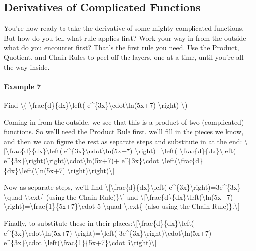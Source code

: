 \hypertarget{derivatives-of-complicated-functions}{%
\subsection{Derivatives of Complicated
Functions}\label{derivatives-of-complicated-functions}}

You're now ready to take the derivative of some mighty complicated
functions. But how do you tell what rule applies first? Work your way in
from the outside -- what do you encounter first? That's the first rule
you need. Use the Product, Quotient, and Chain Rules to peel off the
layers, one at a time, until you're all the way inside.

\hypertarget{example-7}{%
\paragraph{Example 7}\label{example-7}}

Find \textbackslash{}(
\textbackslash{}frac\{d\}\{dx\}\textbackslash{}left(
e\^{}\{3x\}\textbackslash{}cdot\textbackslash{}ln(5x+7)
\textbackslash{}right) \textbackslash{})

Coming in from the outside, we see that this is a product of two
(complicated) functions. So we'll need the Product Rule first. we'll
fill in the pieces we know, and then we can figure the rest as separate
steps and substitute in at the end:
\textbackslash{}{[}\textbackslash{}frac\{d\}\{dx\}\textbackslash{}left(
e\^{}\{3x\}\textbackslash{}cdot\textbackslash{}ln(5x+7)
\textbackslash{}right)=\textbackslash{}left(
\textbackslash{}frac\{d\}\{dx\}\textbackslash{}left(
e\^{}\{3x\}\textbackslash{}right)\textbackslash{}right)\textbackslash{}cdot\textbackslash{}ln(5x+7)+
e\^{}\{3x\}\textbackslash{}cdot
\textbackslash{}left(\textbackslash{}frac\{d\}\{dx\}\textbackslash{}left(\textbackslash{}ln(5x+7)
\textbackslash{}right)\textbackslash{}right)\textbackslash{}{]}

Now as separate steps, we'll find
\textbackslash{}{[}\textbackslash{}frac\{d\}\{dx\}\textbackslash{}left(
e\^{}\{3x\}\textbackslash{}right)=3e\^{}\{3x\} \textbackslash{}quad
\textbackslash{}text\{ (using the Chain Rule)\}\textbackslash{}{]} and
\textbackslash{}{[}\textbackslash{}frac\{d\}\{dx\}\textbackslash{}left(\textbackslash{}ln(5x+7)
\textbackslash{}right)=\textbackslash{}frac\{1\}\{5x+7\}\textbackslash{}cdot
5 \textbackslash{}quad \textbackslash{}text\{ (also using the Chain
Rule)\}.\textbackslash{}{]}

Finally, to substitute these in their
places:\textbackslash{}{[}\textbackslash{}frac\{d\}\{dx\}\textbackslash{}left(
e\^{}\{3x\}\textbackslash{}cdot\textbackslash{}ln(5x+7)
\textbackslash{}right)=\textbackslash{}left(
3e\^{}\{3x\}\textbackslash{}right)\textbackslash{}cdot\textbackslash{}ln(5x+7)+
e\^{}\{3x\}\textbackslash{}cdot
\textbackslash{}left(\textbackslash{}frac\{1\}\{5x+7\}\textbackslash{}cdot
5\textbackslash{}right)\textbackslash{}{]}


